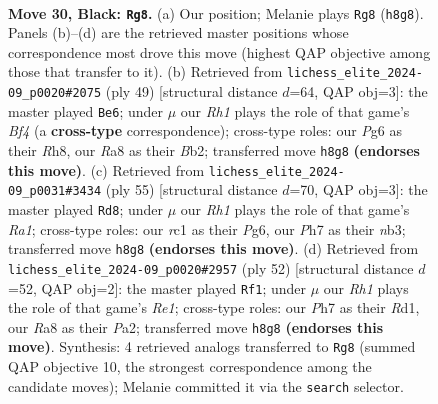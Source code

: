 \documentclass[11pt]{article}
\begin{document}
\clearpage

\begin{figure}[p]\centering
\begin{subfigure}{0.46\textwidth}\centering
\resizebox{\linewidth}{!}{%
\newchessgame
\chessboard[
  setfen={r4k1r/1p3p1p/4b1p1/p2p4/5P2/3K2N1/PP2B1PP/2R3R1 b - - 2 30},
  showmover=false,
  pgfstyle=straightmove, color=movearrow, markmove={h8-g8}
]}
\caption{}
\end{subfigure}\hfill
\begin{subfigure}{0.46\textwidth}\centering
\resizebox{\linewidth}{!}{%
\newchessgame
\chessboard[
  setfen={2k4r/pp3p2/2p3pp/5b2/8/4PP2/Pb2B1PP/3RK2R b K - 0 25},
  showmover=false,
  pgfstyle=straightmove, color=movearrow, markmove={f5-e6}
]}
\caption{}
\end{subfigure}
\\[4pt]
\begin{subfigure}{0.46\textwidth}\centering
\resizebox{\linewidth}{!}{%
\newchessgame
\chessboard[
  setfen={r5k1/p4p1p/n1bP2p1/8/3P4/1Np3PP/P4P2/2B2RK1 b - - 0 28},
  showmover=false,
  pgfstyle=straightmove, color=movearrow, markmove={a8-d8}
]}
\caption{}
\end{subfigure}\hfill
\begin{subfigure}{0.46\textwidth}\centering
\resizebox{\linewidth}{!}{%
\newchessgame
\chessboard[
  setfen={2b4r/p1k1b1pp/8/1PpBn3/4P3/2P5/P5PP/3RR1K1 w - - 5 27},
  showmover=false,
  pgfstyle=straightmove, color=movearrow, markmove={e1-f1}
]}
\caption{}
\end{subfigure}
\caption{\textbf{Move 30, Black: \texttt{Rg8}.} (a) Our position; Melanie plays \texttt{Rg8} (\texttt{h8g8}). Panels (b)--(d) are the retrieved master positions whose correspondence most drove this move (highest QAP objective among those that transfer to it). (b) Retrieved from \texttt{lichess\_elite\_2024-09\_p0020\#2075} (ply 49) [structural distance $d$=64, QAP obj=3]: the master played \texttt{Be6}; under $\mu$ our \emph{Rh1} plays the role of that game's \emph{Bf4} (a \textbf{cross-type} correspondence); cross-type roles: our \emph{P}g6 as their \emph{R}h8, our \emph{R}a8 as their \emph{B}b2; transferred move \texttt{h8g8} \textbf{(endorses this move)}. (c) Retrieved from \texttt{lichess\_elite\_2024-09\_p0031\#3434} (ply 55) [structural distance $d$=70, QAP obj=3]: the master played \texttt{Rd8}; under $\mu$ our \emph{Rh1} plays the role of that game's \emph{Ra1}; cross-type roles: our \emph{r}c1 as their \emph{P}g6, our \emph{P}h7 as their \emph{n}b3; transferred move \texttt{h8g8} \textbf{(endorses this move)}. (d) Retrieved from \texttt{lichess\_elite\_2024-09\_p0020\#2957} (ply 52) [structural distance $d$=52, QAP obj=2]: the master played \texttt{Rf1}; under $\mu$ our \emph{Rh1} plays the role of that game's \emph{Re1}; cross-type roles: our \emph{P}h7 as their \emph{R}d1, our \emph{R}a8 as their \emph{P}a2; transferred move \texttt{h8g8} \textbf{(endorses this move)}. Synthesis: 4 retrieved analogs transferred to \texttt{Rg8} (summed QAP objective 10, the strongest correspondence among the candidate moves); Melanie committed it via the \texttt{search} selector.}
\label{fig:thought-m59}
\end{figure}
\end{document}
